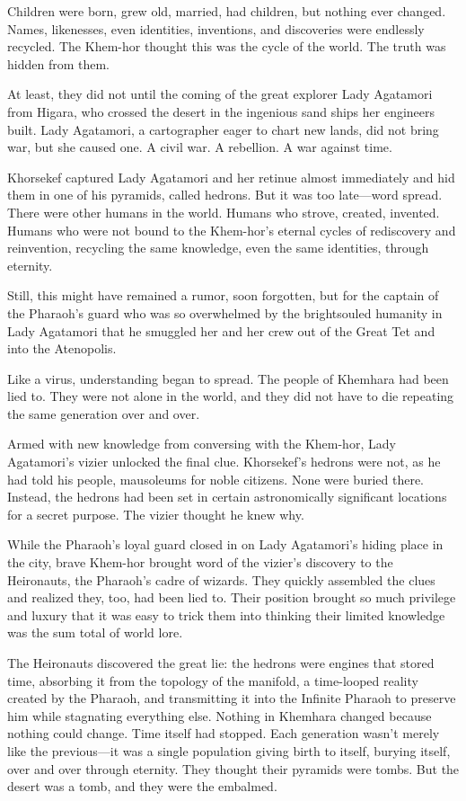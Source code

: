 \documentclass[10pt,a4paper,twoside,bg=print,twocolumn,openany,nodeprecatedcode]{dndbook}
\begin{document}
Children were born, grew old, married, had children, but nothing ever changed. Names, likenesses, even identities, inventions, and discoveries were endlessly recycled. The Khem-hor thought this was the cycle of the world. The truth was hidden from them.

At least, they did not until the coming of the great explorer Lady Agatamori from Higara, who crossed the desert in the ingenious sand ships her engineers built. Lady Agatamori, a cartographer eager to chart new lands, did not bring war, but she caused one. A civil war. A rebellion. A war against time.

Khorsekef captured Lady Agatamori and her retinue almost immediately and hid them in one of his pyramids, called hedrons. But it was too late—word spread. There were other humans in the world. Humans who strove, created, invented. Humans who were not bound to the Khem-hor's eternal cycles of rediscovery and reinvention, recycling the same knowledge, even the same identities, through eternity.

Still, this might have remained a rumor, soon forgotten, but for the captain of the Pharaoh's guard who was so overwhelmed by the brightsouled humanity in Lady Agatamori that he smuggled her and her crew out of the Great Tet and into the Atenopolis.

Like a virus, understanding began to spread. The people of Khemhara had been lied to. They were not alone in the world, and they did not have to die repeating the same generation over and over.

Armed with new knowledge from conversing with the Khem-hor, Lady Agatamori's vizier unlocked the final clue. Khorsekef's hedrons were not, as he had told his people, mausoleums for noble citizens. None were buried there. Instead, the hedrons had been set in certain astronomically significant locations for a secret purpose. The vizier thought he knew why.

While the Pharaoh's loyal guard closed in on Lady Agatamori's hiding place in the city, brave Khem-hor brought word of the vizier's discovery to the Heironauts, the Pharaoh's cadre of wizards. They quickly assembled the clues and realized they, too, had been lied to. Their position brought so much privilege and luxury that it was easy to trick them into thinking their limited knowledge was the sum total of world lore.

The Heironauts discovered the great lie: the hedrons were engines that stored time, absorbing it from the topology of the manifold, a time-looped reality created by the Pharaoh, and transmitting it into the Infinite Pharaoh to preserve him while stagnating everything else. Nothing in Khemhara changed because nothing could change. Time itself had stopped. Each generation wasn't merely like the previous—it was a single population giving birth to itself, burying itself, over and over through eternity. They thought their pyramids were tombs. But the desert was a tomb, and they were the embalmed.
\end{document}
